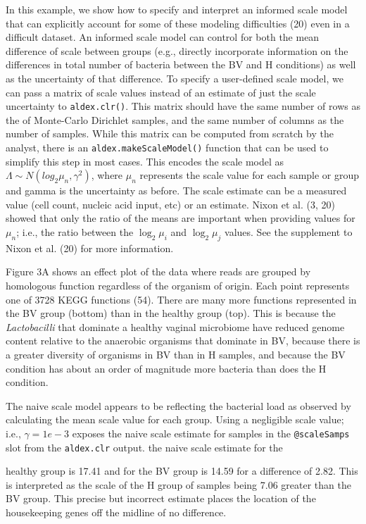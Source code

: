 \documentclass[
]{article}
\begin{document}
In this example, we show how to specify and interpret an informed scale
model that can explicitly account for some of these modeling
difficulties (20) even in a difficult dataset. An informed scale model
can control for both the mean difference of scale between groups (e.g.,
directly incorporate information on the differences in total number of
bacteria between the BV and H conditions) as well as the uncertainty of
that difference. To specify a user-defined scale model, we can pass a
matrix of scale values instead of an estimate of just the scale
uncertainty to \texttt{aldex.clr()}. This matrix should have the same
number of rows as the of Monte-Carlo Dirichlet samples, and the same
number of columns as the number of samples. While this matrix can be
computed from scratch by the analyst, there is an
\texttt{aldex.makeScaleModel()} function that can be used to simplify
this step in most cases. This encodes the scale model as
\(\Lambda \sim N(log_2 \mu_n,
\gamma^{2})\), where \(\mu_n\) represents the scale value for each
sample or group and gamma is the uncertainty as before. The scale
estimate can be a measured value (cell count, nucleic acid input, etc)
or an estimate. Nixon et al. (3, 20) showed that only the ratio of the
means are important when providing values for \(\mu_n\); i.e., the ratio
between the \(\log_2 \mu_i\) and \(\log_2 \mu_j\) values. See the
supplement to Nixon et al. (20) for more information.

Figure 3A shows an effect plot of the data where reads are grouped by
homologous function regardless of the organism of origin. Each point
represents one of 3728 KEGG functions (54). There are many more
functions represented in the BV group (bottom) than in the healthy group
(top). This is because the \textit{Lactobacilli} that dominate a healthy
vaginal microbiome have reduced genome content relative to the anaerobic
organisms that dominate in BV, because there is a greater diversity of
organisms in BV than in H samples, and because the BV condition has
about an order of magnitude more bacteria than does the H condition.

The naive scale model appears to be reflecting the bacterial load as
observed by calculating the mean scale value for each group. Using a
negligible scale value; i.e., \(\gamma=1e-3\) exposes the naive scale
estimate for samples in the \texttt{@scaleSamps} slot from the
\texttt{aldex.clr} output. the naive scale estimate for the

healthy group is 17.41 and for the BV group is 14.59 for a difference of
2.82. This is interpreted as the scale of the H group of samples being
7.06 greater than the BV group. This precise but incorrect estimate
places the location of the housekeeping genes off the midline of no
difference.
\end{document}
